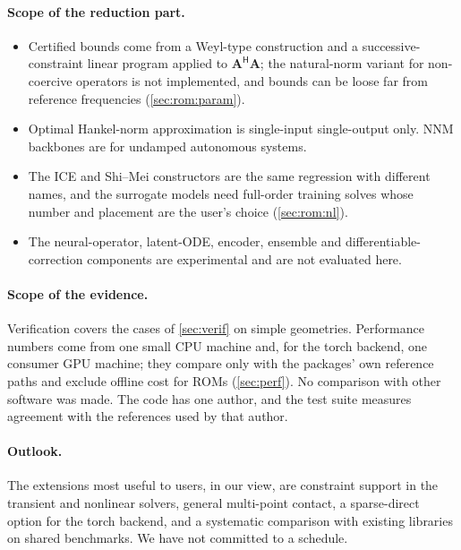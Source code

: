 \paragraph{Scope of the reduction part.}
\begin{itemize}[leftmargin=*,itemsep=2pt]
  \item Certified bounds come from a Weyl-type construction and a successive-constraint linear program applied to $\bm A^{\mathsf H}\bm A$; the natural-norm variant for non-coercive operators is not implemented, and bounds can be loose far from reference frequencies (\cref{sec:rom:param}).
  \item Optimal Hankel-norm approximation is single-input single-output only. NNM backbones are for undamped autonomous systems.
  \item The ICE and Shi--Mei constructors are the same regression with different names, and the surrogate models need full-order training solves whose number and placement are the user's choice (\cref{sec:rom:nl}).
  \item The neural-operator, latent-ODE, encoder, ensemble and differentiable-correction components are experimental and are not evaluated here.
\end{itemize}

\paragraph{Scope of the evidence.}
Verification covers the cases of \cref{sec:verif} on simple geometries. Performance numbers come from one small CPU machine and, for the torch backend, one consumer GPU machine; they compare only with the packages' own reference paths and exclude offline cost for ROMs (\cref{sec:perf}). No comparison with other software was made.
The code has one author, and the test suite measures agreement with the references used by that author.

\paragraph{Outlook.}
The extensions most useful to users, in our view, are constraint support in the transient and nonlinear solvers, general multi-point contact, a sparse-direct option for the torch backend, and a systematic comparison with existing libraries on shared benchmarks. We have not committed to a schedule.
